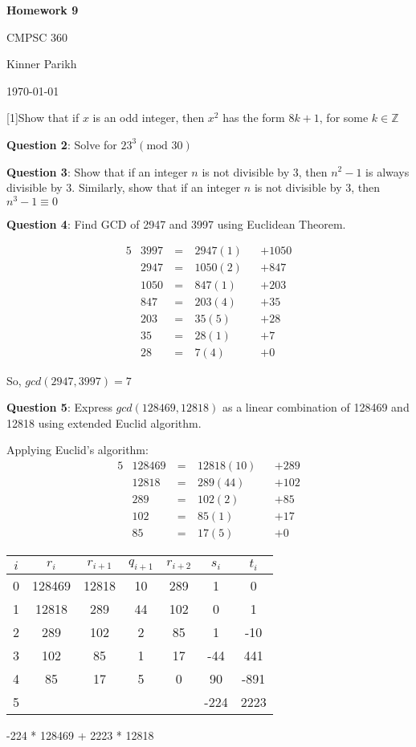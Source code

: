 \documentclass{article} %
\newcommand{\question}[2][]{\begin{flushleft}
        \textbf{Question #1}: #2

\end{flushleft}}
\newcommand{\maketitletwo}[2][]{\begin{center}
        \Large{\textbf{Homework #1}
            
            CMPSC 360} %
        \vspace{5pt}
        
        \normalsize{Kinner Parikh  %
        
        \today}        %
        \vspace{15pt}
        
\end{center}}
\begin{document}
    \maketitletwo[9]  %
    
    \question[1]{Show that if $x$ is an odd integer, then $x^2$ has the form $8k + 1$, for some $k \in \mathbb{Z}$}

    \question[2]{Solve for $23 ^ 3 (\text{mod } 30)$}

    \question[3]{Show that if an integer $n$ is not divisible by 3, then $n^2 - 1$ is always divisible by 3. 
    Similarly, show that if an integer $n$ is not divisible by 3, then $n^3 - 1 \equiv 0$}

    \question[4]{Find GCD of 2947 and 3997 using Euclidean Theorem.}
    \begin{alignat*}{5}
        &3997\ &=\ &2947(1) &&+ 1050\\
        &2947  &=\ &1050(2) &&+ 847\\
        &1050  &=\ &847(1)  &&+ 203\\
        &847   &=\ &203(4)  &&+ 35\\
        &203   &=\ &35(5)   &&+ 28\\
        &35    &=\ &28(1)   &&+ 7\\
        &28    &=\ &7(4)    &&+ 0
    \end{alignat*}

    So, $gcd(2947, 3997) = 7$

    \question[5]{Express $gcd(128469, 12818)$ as a linear combination of 128469 and 12818 using 
    extended Euclid algorithm.}

    Applying Euclid's algorithm:
    \begin{alignat*}{5}
        &128469\ &=\ &12818(10) &&+ 289\\
        &12818   &=\ &289  (44) &&+ 102\\
        &289     &=\ &102  (2) &&+   85\\
        &102     &=\ &85   (1) &&+   17\\
        &85      &=\ &17   (5) &&+    0
    \end{alignat*}

    \begin{tabular}{|c|c|c|c|c|c|c|}
        \hline
        $i$ & $r_i$ & $r_{i + 1}$ & $q_{i + 1}$ & $r_{i + 2}$ & $s_i$ & $t_i$\\\hline
        0 & 128469 & 12818 & 10 & 289 & 1 & 0\\
        1 & 12818  & 289   & 44 & 102 & 0 & 1\\
        2 & 289    & 102   & 2  &  85 & 1 & -10\\
        3 & 102    & 85    & 1  &  17 & -44 & 441\\
        4 & 85     & 17    & 5  &   0 & 90 & -891\\
        5 &        &       &    &     & -224 & 2223 \\\hline 
    \end{tabular} 
    -224 * 128469 + 2223 * 12818
\end{document}
